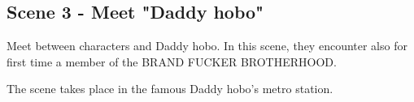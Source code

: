 \subsection{Scene 3 - Meet "Daddy hobo"}

\begin{scene_summary}
Meet between characters and Daddy hobo. In this scene, they encounter also for first time a member of the  BRAND FUCKER BROTHERHOOD.
\end{scene_summary}

\begin{location_description}
The scene takes place in the famous Daddy hobo's metro station. 
\end{location_description}


